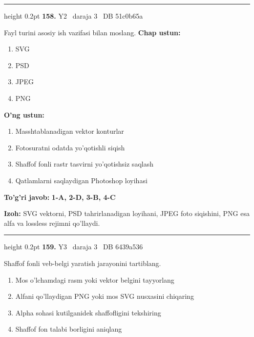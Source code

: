 \documentclass[10pt,a4paper,oneside]{article}
\begin{document}
\vspace{2mm}\hrule height 0.2pt \vspace{4mm}
\hypertarget{q158}{\textbf{\color{ink}158.}}  {\color{muted}\scriptsize Y2 \textbullet\ daraja 3 \textbullet\ DB 51c0b65a}
\par
Fayl turini asosiy ish vazifasi bilan moslang.
\textbf{\footnotesize Chap ustun:}
\begin{enumerate}[label=\arabic*),leftmargin=9mm]
\item SVG
\item PSD
\item JPEG
\item PNG
\end{enumerate}
\textbf{\footnotesize O'ng ustun:}
\begin{enumerate}[label=\Alph*),leftmargin=9mm]
\item Masshtablanadigan vektor konturlar
\item Fotosuratni odatda yo'qotishli siqish
\item Shaffof fonli rastr tasvirni yo'qotishsiz saqlash
\item Qatlamlarni saqlaydigan Photoshop loyihasi
\end{enumerate}
\begin{tcolorbox}[enhanced,breakable,colback=teal!4,colframe=teal!45!black,boxrule=0.45pt,arc=1.2mm,left=2.8mm,right=2.8mm,top=2mm,bottom=2mm,before skip=2mm,after skip=2mm]
\textbf{\color{teal}To'g'ri javob:} \textbf{1-A, 2-D, 3-B, 4-C}
\par\smallskip
\textbf{Izoh:} SVG vektorni, PSD tahrirlanadigan loyihani, JPEG foto siqishini, PNG esa alfa va lossless rejimni qo'llaydi.
\end{tcolorbox}
\vspace{2mm}\hrule height 0.2pt \vspace{4mm}
\hypertarget{q159}{\textbf{\color{ink}159.}}  {\color{muted}\scriptsize Y3 \textbullet\ daraja 3 \textbullet\ DB 6439a536}
\par
Shaffof fonli veb-belgi yaratish jarayonini tartiblang.
\begin{enumerate}[label=\Alph*),leftmargin=9mm]
\item Mos o'lchamdagi rasm yoki vektor belgini tayyorlang
\item Alfani qo'llaydigan PNG yoki mos SVG nusxasini chiqaring
\item Alpha sohasi kutilganidek shaffofligini tekshiring
\item Shaffof fon talabi borligini aniqlang
\end{enumerate}
\end{document}
